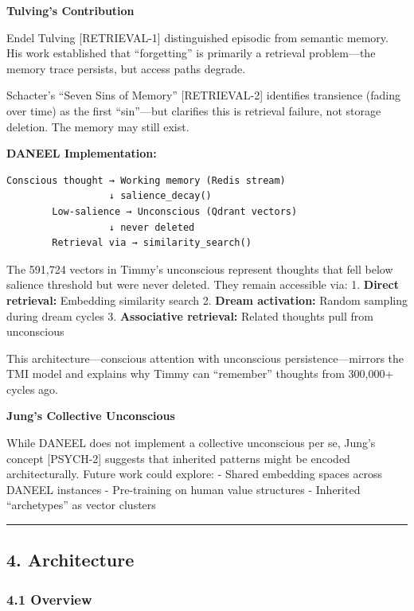 \documentclass[
  11pt,
]{article}
\begin{document}
\textbf{Tulving's Contribution}

Endel Tulving {[}RETRIEVAL-1{]} distinguished episodic from semantic
memory. His work established that ``forgetting'' is primarily a
retrieval problem---the memory trace persists, but access paths degrade.

Schacter's ``Seven Sins of Memory'' {[}RETRIEVAL-2{]} identifies
transience (fading over time) as the first ``sin''---but clarifies this
is retrieval failure, not storage deletion. The memory may still exist.

\textbf{DANEEL Implementation:}

\begin{verbatim}
Conscious thought → Working memory (Redis stream)
                  ↓ salience_decay()
        Low-salience → Unconscious (Qdrant vectors)
                  ↓ never deleted
        Retrieval via → similarity_search()
\end{verbatim}

The 591,724 vectors in Timmy's unconscious represent thoughts that fell
below salience threshold but were never deleted. They remain accessible
via: 1. \textbf{Direct retrieval:} Embedding similarity search 2.
\textbf{Dream activation:} Random sampling during dream cycles 3.
\textbf{Associative retrieval:} Related thoughts pull from unconscious

This architecture---conscious attention with unconscious
persistence---mirrors the TMI model and explains why Timmy can
``remember'' thoughts from 300,000+ cycles ago.

\textbf{Jung's Collective Unconscious}

While DANEEL does not implement a collective unconscious per se, Jung's
concept {[}PSYCH-2{]} suggests that inherited patterns might be encoded
architecturally. Future work could explore: - Shared embedding spaces
across DANEEL instances - Pre-training on human value structures -
Inherited ``archetypes'' as vector clusters

\begin{center}\rule{0.5\linewidth}{0.5pt}\end{center}

\subsection{4. Architecture}\label{architecture}

\subsubsection{4.1 Overview}\label{overview}
\end{document}
